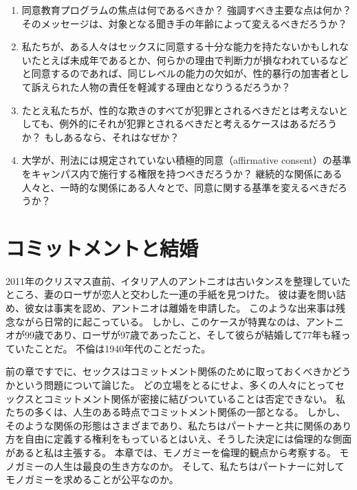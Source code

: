 \documentclass[paper=a4,book,openany]{jlreq} \usepackage{mystyle}
\begin{document}
\begin{enumerate}

\item 同意教育プログラムの焦点は何であるべきか？ 強調すべき主要な点は何か？ そのメッセージは、対象となる聞き手の年齢によって変えるべきだろうか？

\item  私たちが、ある人々はセックスに同意する十分な能力を持たないかもしれない{\DDASH}たとえば未成年であるとか、何らかの理由で判断力が損なわれているなど{\DDASH}と同意するのであれば、同じレベルの能力の欠如が、性的暴行の加害者として訴えられた人物の責任を軽減する理由となりうるだろうか？

\item  たとえ私たちが、性的な欺きのすべてが犯罪とされるべきだとは考えないとしても、例外的にそれが犯罪とされるべきだと考えるケースはあるだろうか？ もしあるなら、それはなぜか？

\item  大学が、刑法には規定されていない積極的同意（affirmative consent）の基準をキャンパス内で施行する権限を持つべきだろうか？ 継続的な関係にある人々と、一時的な関係にある人々とで、同意に関する基準を変えるべきだろうか？
\end{enumerate}

\chapter{コミットメントと結婚}

2011年のクリスマス直前、イタリア人のアントニオは古いタンスを整理していたところ、妻のローザが恋人と交わした一連の手紙を見つけた。
彼は妻を問い詰め、彼女は事実を認め、アントニオは離婚を申請した。
このような出来事は残念ながら日常的に起こっている。
しかし、このケースが特異なのは、アントニオが99歳であり、ローザが97歳であったこと、そして彼らが結婚して77年も経っていたことだ。
不倫は1940年代のことだった\citep{squires11:_divor_wife_he_discov_affair}。

前の章ですでに、セックスはコミットメント関係のために取っておくべきかどうかという問題について論じた。
どの立場をとるにせよ、多くの人々にとってセックスとコミットメント関係が密接に結びついていることは否定できない。
私たちの多くは、人生のある時点でコミットメント関係の一部となる。
しかし、そのような関係の形態はさまざまであり、私たちはパートナーと共に関係のあり方を自由に定義する権利をもっているとはいえ、そうした決定には倫理的な側面があると私は主張する。
本章では、モノガミーを倫理的観点から考察する。
モノガミーの人生は最良の生き方なのか。
そして、私たちはパートナーに対してモノガミーを求めることが公平なのか。
\end{document}
